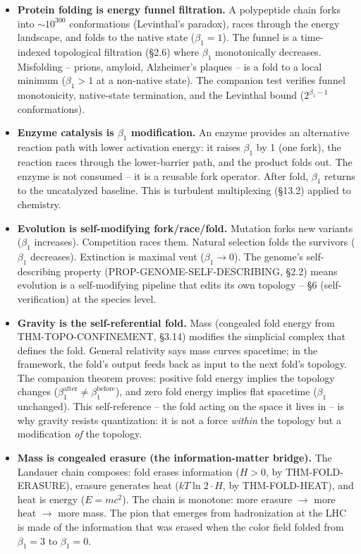 \documentclass[
  11pt,
]{article}
\begin{document}
\begin{itemize}
\item
  \textbf{Protein folding is energy funnel filtration.} A polypeptide
  chain forks into \(\sim 10^{300}\) conformations (Levinthal's
  paradox), races through the energy landscape, and folds to the native
  state (\(\beta_1 = 1\)). The funnel is a time-indexed topological
  filtration (§2.6) where \(\beta_1\) monotonically decreases.
  Misfolding -- prions, amyloid, Alzheimer's plaques -- is a fold to a
  local minimum (\(\beta_1 > 1\) at a non-native state). The companion
  test verifies funnel monotonicity, native-state termination, and the
  Levinthal bound (\(2^{\beta_1 - 1}\) conformations).
\item
  \textbf{Enzyme catalysis is \(\beta_1\) modification.} An enzyme
  provides an alternative reaction path with lower activation energy: it
  raises \(\beta_1\) by 1 (one fork), the reaction races through the
  lower-barrier path, and the product folds out. The enzyme is not
  consumed -- it is a reusable fork operator. After fold, \(\beta_1\)
  returns to the uncatalyzed baseline. This is turbulent multiplexing
  (§13.2) applied to chemistry.
\item
  \textbf{Evolution is self-modifying fork/race/fold.} Mutation forks
  new variants (\(\beta_1\) increases). Competition races them. Natural
  selection folds the survivors (\(\beta_1\) decreases). Extinction is
  maximal vent (\(\beta_1 \to 0\)). The genome's self-describing
  property (PROP-GENOME-SELF-DESCRIBING, §2.2) means evolution is a
  self-modifying pipeline that edits its own topology -- §6
  (self-verification) at the species level.
\item
  \textbf{Gravity is the self-referential fold.} Mass (congealed fold
  energy from THM-TOPO-CONFINEMENT, §3.14) modifies the simplicial
  complex that defines the fold. General relativity says mass curves
  spacetime; in the framework, the fold's output feeds back as input to
  the next fold's topology. The companion theorem proves: positive fold
  energy implies the topology changes
  (\(\beta_1^{\text{after}} \neq \beta_1^{\text{before}}\)), and zero
  fold energy implies flat spacetime (\(\beta_1\) unchanged). This
  self-reference -- the fold acting on the space it lives in -- is why
  gravity resists quantization: it is not a force \emph{within} the
  topology but a modification \emph{of} the topology.
\item
  \textbf{Mass is congealed erasure (the information-matter bridge).}
  The Landauer chain composes: fold erases information (\(H > 0\), by
  THM-FOLD-ERASURE), erasure generates heat (\(kT \ln 2 \cdot H\), by
  THM-FOLD-HEAT), and heat is energy (\(E = mc^2\)). The chain is
  monotone: more erasure \(\to\) more heat \(\to\) more mass. The pion
  that emerges from hadronization at the LHC is made of the information
  that was erased when the color field folded from \(\beta_1 = 3\) to
  \(\beta_1 = 0\).
\end{itemize}
\end{document}
